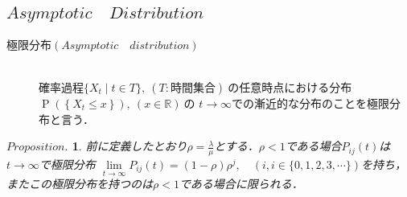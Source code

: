 \documentclass[a4j,papersize,disablejfam,slide,14pt]{jsarticle}
\newtheorem{Prop}{$Proposition.$}
\def\prob#1{\operatorname{P} \left(\left\{ #1 \right\}\right)} %
\begin{document}
\subsection{$Asymptotic\quad Distribution$}
    \begin{screen}
    	\begin{description}
        	\item[極限分布$(Asymptotic\quad distribution)$]\mbox{}\\
            	確率過程$\{ X_t \mid t \in T \},\ (T:\mbox{時間集合})\ $の任意時点における分布$\prob{X_t \leq x},\ (x \in \mathbb{R})\ $の
                $t \to \infty$での漸近的な分布のことを極限分布と言う．
        \end{description}
    \end{screen}
    \begin{screen}
    	\begin{Prop}
        \label{Prop:asymptotic_dist}
        	前に定義したとおり$\rho=\frac{\lambda}{\mu}$とする．$\rho < 1$である場合$P_{ij}(t)$は$t \to \infty$で極限分布
            $\lim\limits_{t \to \infty} P_{ij}(t) = (1-\rho)\rho^j, \quad (i,i \in \{ 0,1,2,3,\cdots \})$を持ち，またこの極限分布を持つのは$\rho < 1$である場合に限られる．
        \end{Prop}
    \end{screen}
\end{document}
